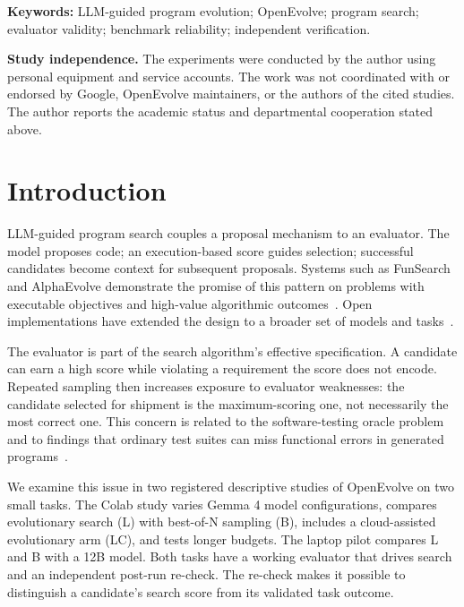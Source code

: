 \documentclass[11pt]{article}
\begin{document}
\noindent\textbf{Keywords:} LLM-guided program evolution; OpenEvolve; program search; evaluator validity; benchmark reliability; independent verification.

\medskip
\noindent\textbf{Study independence.} The experiments were conducted by the author using personal equipment and service accounts. The work was not coordinated with or endorsed by Google, OpenEvolve maintainers, or the authors of the cited studies. The author reports the academic status and departmental cooperation stated above.

\section{Introduction}\label{sec:intro}

LLM-guided program search couples a proposal mechanism to an evaluator. The model proposes code; an execution-based score guides selection; successful candidates become context for subsequent proposals. Systems such as FunSearch and AlphaEvolve demonstrate the promise of this pattern on problems with executable objectives and high-value algorithmic outcomes~\citep{romera2024funsearch,novikov2025alphaevolve}. Open implementations have extended the design to a broader set of models and tasks~\citep{assumpcao2025codeevolve,sharma2026openevolve}.

The evaluator is part of the search algorithm's effective specification. A candidate can earn a high score while violating a requirement the score does not encode. Repeated sampling then increases exposure to evaluator weaknesses: the candidate selected for shipment is the maximum-scoring one, not necessarily the most correct one. This concern is related to the software-testing oracle problem and to findings that ordinary test suites can miss functional errors in generated programs~\citep{barr2015oracle,liu2023evalplus}.

We examine this issue in two registered descriptive studies of OpenEvolve on two small tasks. The Colab study varies Gemma 4 model configurations, compares evolutionary search (L) with best-of-N sampling (B), includes a cloud-assisted evolutionary arm (LC), and tests longer budgets. The laptop pilot compares L and B with a 12B model. Both tasks have a working evaluator that drives search and an independent post-run re-check. The re-check makes it possible to distinguish a candidate's search score from its validated task outcome.
\end{document}
